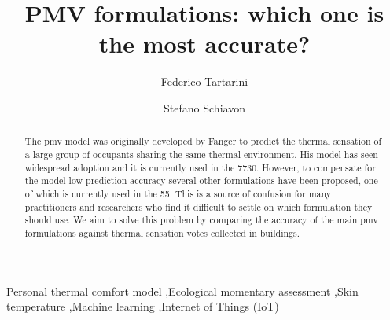 
\begin{frontmatter}

    \title{PMV formulations: which one is the most accurate?}

    \author[label1]{Federico Tartarini}
    \author[label2]{Stefano Schiavon}

    \address[label1]{Berkeley Education Alliance for Research in Singapore, Singapore}
    \address[label2]{Center for the Built Environment, University of California, Berkeley, CA, USA}


    \begin{abstract}
        The \ac{pmv} model was originally developed by Fanger to predict the thermal sensation of a large group of occupants sharing the same thermal environment.
        His model has seen widespread adoption and it is currently used in the \gls{7730}.
        However, to compensate for the model low prediction accuracy several other formulations have been proposed, one of which is currently used in the \gls{55}.
        This is a source of confusion for many practitioners and researchers who find it difficult to settle on which formulation they should use.
        We aim to solve this problem by comparing the accuracy of the main \ac{pmv} formulations against  thermal sensation votes collected in buildings.
    \end{abstract}

    \begin{keyword}
        Personal thermal comfort model \sep Ecological momentary assessment \sep Skin temperature \sep Machine learning \sep Internet of Things (IoT)
    \end{keyword}

\end{frontmatter}
